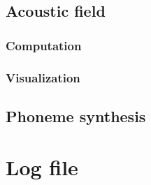 \documentclass[]{article}
\begin{document}
	\subsection{Acoustic field}
	
	\subsubsection{Computation}
	
	\subsubsection{Visualization}
	
	\subsection{Phoneme synthesis}
	
	\section{Log file}
	
	
	\printbibliography
%	
%	
\end{document}
